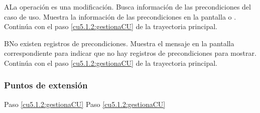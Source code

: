  \begin{UCtrayectoriaA}{A}{La operación es una modificación.}
    \UCpaso[\UCsist] Busca información de las precondiciones del caso de uso. 
    \UCpaso[\UCsist] Muestra la información de las precondiciones en la pantalla  o . 
    \UCpaso[] Continúa con el paso \ref{cu5.1.2:gestionaCU} de la trayectoria principal.
 \end{UCtrayectoriaA}
 
 \begin{UCtrayectoriaA}{B}{No existen registros de precondiciones.}
    \UCpaso[\UCsist] Muestra el mensaje  en la pantalla correspondiente
    para indicar que no hay registros de precondiciones para mostrar.
    \UCpaso[] Continúa con el paso \ref{cu5.1.2:gestionaCU} de la trayectoria principal.
 \end{UCtrayectoriaA}
 

\subsubsection{Puntos de extensión}

	{Paso \ref{cu5.1.2:gestionaCU}}
	{}
	{Paso \ref{cu5.1.2:gestionaCU}}
	{}
  